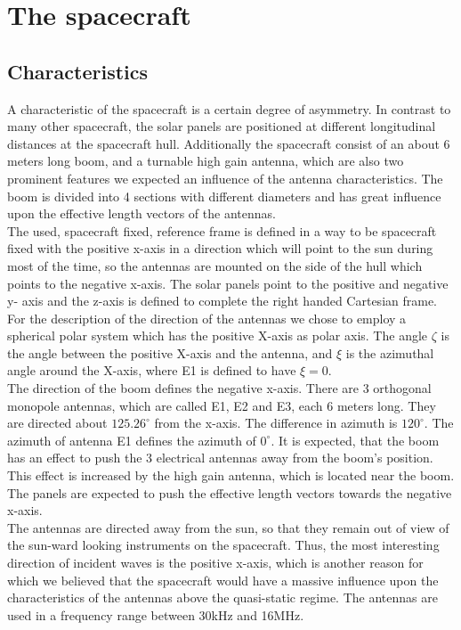 \documentclass[a4paper,14pt]{extbook}
\begin{document}
\section{The spacecraft}
\subsection{Characteristics}

A characteristic of the spacecraft is a certain degree of
asymmetry. In contrast to many other spacecraft, the solar panels
are positioned at different longitudinal distances at the
spacecraft hull. Additionally the spacecraft consist of an about
6 meters long boom, and a turnable high gain antenna, which are also two
prominent features we expected an influence of the antenna
characteristics. The boom is divided into 4 sections with
different diameters and has great influence upon
the effective length vectors of the antennas.\\


The used, spacecraft fixed, reference frame is defined in a way to be spacecraft fixed with the positive x-axis in a direction which will point to the sun during most of the time, so the antennas are mounted on the side of the hull which points to the negative x-axis. The solar panels point to the positive and negative y- axis and the z-axis is defined to complete the right handed Cartesian frame.\\


For the description of the direction of the antennas we chose to employ a spherical polar system which has the positive X-axis as polar axis. The angle $\zeta$ is the angle between the positive X-axis and the antenna, and $\xi$ is the azimuthal angle around the X-axis, where E1 is defined to have $\xi=0$.\\

The direction of the
boom defines the negative x-axis. There are 3 orthogonal monopole antennas,
which are called E1, E2 and E3, each 6 meters
long. They are directed about $125.26^\circ$ from the x-axis. The
difference in azimuth is $120^\circ$. The azimuth of antenna
E1 defines the azimuth of $0^\circ$. It is expected, that the boom has an
effect to push the 3 electrical antennas away from the boom's position. This effect is
increased by the high gain antenna, which is located near the
boom. The panels are expected to push the effective length vectors
towards the negative x-axis.\\

The antennas are directed away from the sun, so that they
remain out of view of the sun-ward looking instruments on the
spacecraft. Thus, the most interesting direction of incident waves
is the positive x-axis, which is another reason for which we
believed that the spacecraft would have a massive influence upon the
characteristics of the antennas above the quasi-static regime. The
antennas are used in a frequency range between 30kHz and
16MHz.\\
\end{document}
